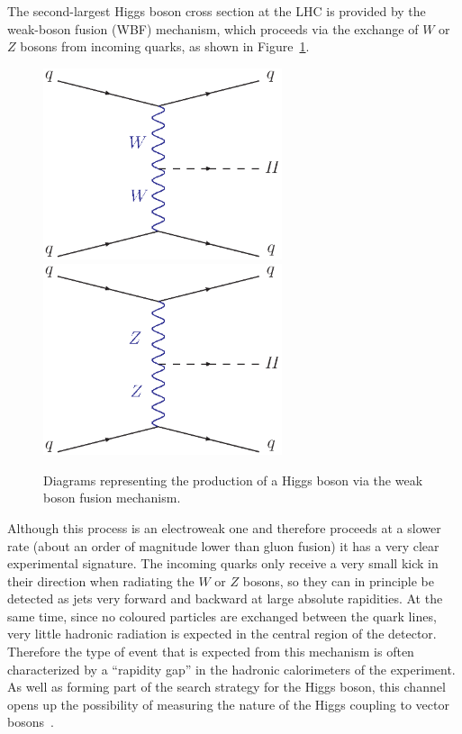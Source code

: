 \documentclass[12pt]{iopart}
\begin{document}
The second-largest Higgs boson cross section at the LHC is provided by the weak-boson fusion (WBF) mechanism, which proceeds
via the exchange of $W$ or $Z$ bosons from incoming quarks, as shown in Figure~\ref{fig:wbf}.
%
\begin{figure}[t]
\begin{center}    
\includegraphics[width=7cm]{wbf_w.ps}    
\includegraphics[width=7cm]{wbf_z.ps}    
\end{center}    
\caption{Diagrams representing the production of a Higgs boson via the weak boson fusion mechanism.}
\label{fig:wbf}
\end{figure}
%
Although this process is an electroweak one and therefore proceeds at a slower rate (about an order of magnitude lower than
gluon fusion) it has a
very clear experimental signature. The incoming quarks only receive a very small kick in their direction when radiating the
$W$ or $Z$ bosons, so they can in principle be detected as jets very forward and backward at large absolute rapidities.
At the same time, since no
coloured particles are exchanged between the quark lines, very little hadronic radiation is expected in the central region of
the detector. Therefore the type of event that is expected from this mechanism is often characterized by a ``rapidity gap''
in the hadronic calorimeters of the experiment. As well as forming part of the search strategy for the Higgs boson, this channel
opens up the possibility of measuring the nature of the Higgs coupling to vector bosons~\cite{Zeppenfeld:2000td}.
\end{document}
